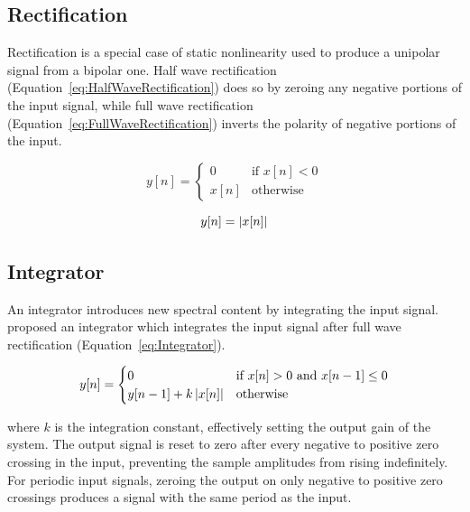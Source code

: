 	\subsection{Rectification}
	\label{sec:Excitation-Methods-Rectification}
		Rectification is a special case of static nonlinearity used to produce a unipolar signal from a bipolar
		one.  Half wave rectification (Equation~\ref{eq:HalfWaveRectification}) does so by zeroing any negative
		portions of the input signal, while full wave rectification (Equation~\ref{eq:FullWaveRectification})
		inverts the polarity of negative portions of the input.

		\begin{equation}
			y[n] = \begin{cases}
				0 & \text{if $x[n] < 0$} \\
				x[n] & \text{otherwise}
			\end{cases}
			\label{eq:HalfWaveRectification}
		\end{equation}

		\begin{equation}
			y[n] = \left|x[n]\right|
			\label{eq:FullWaveRectification}
		\end{equation}

	\subsection{Integrator}
	\label{sec:Excitation-Methods-Integrator}
		An integrator introduces new spectral content by integrating the input signal. \citet{larsen2004audio}
		proposed an integrator which integrates the input signal after full wave rectification
		(Equation~\ref{eq:Integrator}).

		\begin{equation}
			y[n] = \begin{cases}
				0 & \text{if $x[n] > 0$ and $x[n - 1] \leq 0$} \\
				y[n - 1] + k\left|x[n]\right| & \text{otherwise}
			\end{cases}
			\label{eq:Integrator}
		\end{equation}

		where $k$ is the integration constant, effectively setting the output gain of the system. The output signal
		is reset to zero after every negative to positive zero crossing in the input, preventing the sample
		amplitudes from rising indefinitely. For periodic input signals, zeroing the output on only negative to
		positive zero crossings produces a signal with the same period as the input.

